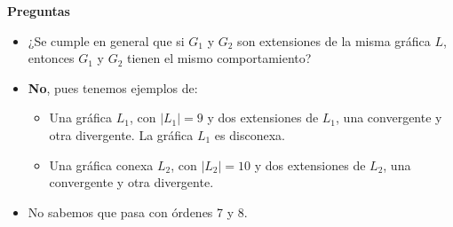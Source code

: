 \documentclass[beamer]{standalone}
\begin{document}
\begin{standaloneframe}
  \begin{center}
    \textbf{Preguntas}
  \end{center}
  \begin{itemize}
  \item ¿Se cumple en general que si $G_{1}$ y $G_{2}$ son extensiones
    de la misma gráfica $L$, entonces $G_{1}$ y $G_{2}$ tienen el
    mismo comportamiento?\pause
  \item \textbf{No}, pues tenemos ejemplos de:\pause
    \begin{itemize}
    \item Una gráfica $L_{1}$, con $|L_{1}|=9$ y dos extensiones de
      $L_{1}$, una convergente y otra divergente. La gráfica $L_{1}$
      es disconexa.\pause
    \item Una gráfica conexa $L_{2}$, con $|L_{2}|=10$ y dos extensiones de
      $L_{2}$, una convergente y otra divergente.\pause
    \end{itemize}
  \item No sabemos que pasa con órdenes 7 y 8.
  \end{itemize}
\end{standaloneframe}
\end{document}
